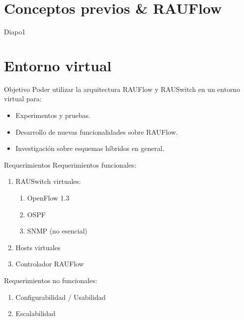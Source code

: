 \documentclass[xcolor=svgnames]{beamer}
\begin{document}
\section{Conceptos previos \& RAUFlow}

\begin{frame}{}
	\tableofcontents[currentsection]
\end{frame}

\begin{frame}{Diapo1}
	
\end{frame}

\section{Entorno virtual}

\begin{frame}{}
	\tableofcontents[currentsection]
\end{frame}

\begin{frame}{Objetivo}
	Poder utilizar la arquitectura RAUFlow y RAUSwitch en un entorno virtual para:
	\begin{itemize}
		\item Experimentos y pruebas.
		\item Desarrollo de nuevas funcionalidades sobre RAUFlow.
		\item Investigación sobre esquemas híbridos en general.
	\end{itemize}
\end{frame}

\begin{frame}{Requerimientos}
	Requerimientos funcionales:
	\begin{enumerate}
		\item RAUSwitch virtuales:
		\begin{enumerate}
			\item OpenFlow 1.3
			\item OSPF
			\item SNMP (no esencial)
		\end{enumerate}
		\item Hosts virtuales
		\item Controlador RAUFlow
	\end{enumerate}
	\pause
	Requerimientos no funcionales:
	\begin{enumerate}
		\item Configurabilidad / Usabilidad
		\item Escalabilidad
	\end{enumerate}
\end{frame}
\end{document}

